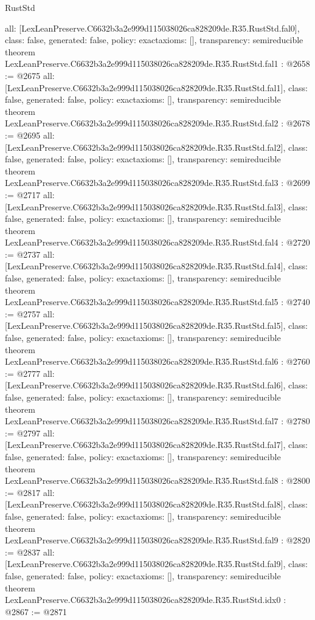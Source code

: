\begin{lexlean}{RustStd}
\begin{coremodule}
{  all: [LexLeanPreserve.C6632b3a2e999d115038026ca828209de.R35.RustStd.fal0],
  class: false,
  generated: false,
  policy: exact{axioms: []},
  transparency: semireducible
}
theorem LexLeanPreserve.C6632b3a2e999d115038026ca828209de.R35.RustStd.fal1 : @2658 := @2675 {
  all: [LexLeanPreserve.C6632b3a2e999d115038026ca828209de.R35.RustStd.fal1],
  class: false,
  generated: false,
  policy: exact{axioms: []},
  transparency: semireducible
}
theorem LexLeanPreserve.C6632b3a2e999d115038026ca828209de.R35.RustStd.fal2 : @2678 := @2695 {
  all: [LexLeanPreserve.C6632b3a2e999d115038026ca828209de.R35.RustStd.fal2],
  class: false,
  generated: false,
  policy: exact{axioms: []},
  transparency: semireducible
}
theorem LexLeanPreserve.C6632b3a2e999d115038026ca828209de.R35.RustStd.fal3 : @2699 := @2717 {
  all: [LexLeanPreserve.C6632b3a2e999d115038026ca828209de.R35.RustStd.fal3],
  class: false,
  generated: false,
  policy: exact{axioms: []},
  transparency: semireducible
}
theorem LexLeanPreserve.C6632b3a2e999d115038026ca828209de.R35.RustStd.fal4 : @2720 := @2737 {
  all: [LexLeanPreserve.C6632b3a2e999d115038026ca828209de.R35.RustStd.fal4],
  class: false,
  generated: false,
  policy: exact{axioms: []},
  transparency: semireducible
}
theorem LexLeanPreserve.C6632b3a2e999d115038026ca828209de.R35.RustStd.fal5 : @2740 := @2757 {
  all: [LexLeanPreserve.C6632b3a2e999d115038026ca828209de.R35.RustStd.fal5],
  class: false,
  generated: false,
  policy: exact{axioms: []},
  transparency: semireducible
}
theorem LexLeanPreserve.C6632b3a2e999d115038026ca828209de.R35.RustStd.fal6 : @2760 := @2777 {
  all: [LexLeanPreserve.C6632b3a2e999d115038026ca828209de.R35.RustStd.fal6],
  class: false,
  generated: false,
  policy: exact{axioms: []},
  transparency: semireducible
}
theorem LexLeanPreserve.C6632b3a2e999d115038026ca828209de.R35.RustStd.fal7 : @2780 := @2797 {
  all: [LexLeanPreserve.C6632b3a2e999d115038026ca828209de.R35.RustStd.fal7],
  class: false,
  generated: false,
  policy: exact{axioms: []},
  transparency: semireducible
}
theorem LexLeanPreserve.C6632b3a2e999d115038026ca828209de.R35.RustStd.fal8 : @2800 := @2817 {
  all: [LexLeanPreserve.C6632b3a2e999d115038026ca828209de.R35.RustStd.fal8],
  class: false,
  generated: false,
  policy: exact{axioms: []},
  transparency: semireducible
}
theorem LexLeanPreserve.C6632b3a2e999d115038026ca828209de.R35.RustStd.fal9 : @2820 := @2837 {
  all: [LexLeanPreserve.C6632b3a2e999d115038026ca828209de.R35.RustStd.fal9],
  class: false,
  generated: false,
  policy: exact{axioms: []},
  transparency: semireducible
}
theorem LexLeanPreserve.C6632b3a2e999d115038026ca828209de.R35.RustStd.idx0 : @2867 := @2871 {
}
\end{coremodule}
\end{lexlean}
